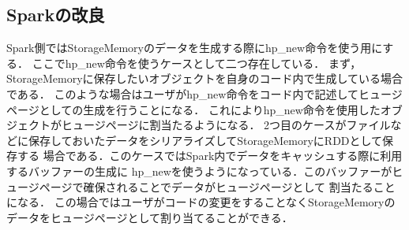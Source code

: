 \subsection{Sparkの改良}
Spark側ではStorageMemoryのデータを生成する際にhp\_new命令を使う用にする．
ここでhp\_new命令を使うケースとして二つ存在している．
まず，StorageMemoryに保存したいオブジェクトを自身のコード内で生成している場合である．
このような場合はユーザがhp\_new命令をコード内で記述してヒュージページとしての生成を行うことになる．
これによりhp\_new命令を使用したオブジェクトがヒュージページに割当たるようになる．
2つ目のケースがファイルなどに保存しておいたデータをシリアライズしてStorageMemoryにRDDとして保存する
場合である．このケースではSpark内でデータをキャッシュする際に利用するバッファーの生成に
hp\_newを使うようになっている．このバッファーがヒュージページで確保されることでデータがヒュージページとして
割当たることになる．
この場合ではユーザがコードの変更をすることなくStorageMemoryのデータをヒュージページとして割り当てることができる．



